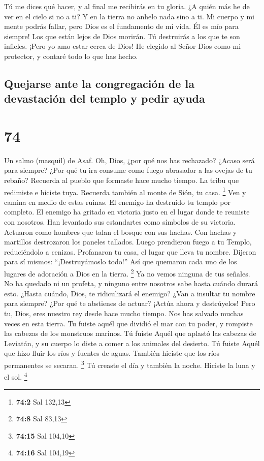  Tú me dices qué hacer, y al final me recibirás en tu
gloria.  ¿A quién más he de ver en el cielo si no a ti? Y
en la tierra no anhelo nada sino a ti.  Mi cuerpo y mi
mente podrás fallar, pero Dios es el fundamento de mi vida. Él es mío
para siempre!  Los que están lejos de Dios morirán. Tú
destruirás a los que te son infieles.  ¡Pero yo amo estar
cerca de Dios! He elegido al Señor Dios como mi protector, y contaré
todo lo que has hecho.

\hypertarget{quejarse-ante-la-congregaciuxf3n-de-la-devastaciuxf3n-del-templo-y-pedir-ayuda}{%
\subsection{Quejarse ante la congregación de la devastación del templo y
pedir
ayuda}\label{quejarse-ante-la-congregaciuxf3n-de-la-devastaciuxf3n-del-templo-y-pedir-ayuda}}

\hypertarget{section-73}{%
\section{74}\label{section-73}}

Un salmo (masquil) de Asaf.  Oh, Dios, ¿por qué nos has
rechazado? ¿Acaso será para siempre? ¿Por qué tu ira consume como fuego
abrasador a las ovejas de tu rebaño?  Recuerda al pueblo que
formaste hace mucho tiempo. La tribu que redimiste e hiciste tuya.
Recuerda también al monte de Sión, tu casa. \footnote{\textbf{74:2} Sal
  132,13}  Ven y camina en medio de estas ruinas. El enemigo
ha destruido tu templo por completo.  El enemigo ha gritado
en victoria justo en el lugar donde te reuniste con nosotros. Han
levantado sus estandartes como símbolos de su victoria. 
Actuaron como hombres que talan el bosque con sus hachas. 
Con hachas y martillos destrozaron los paneles tallados. 
Luego prendieron fuego a tu Templo, reduciéndolo a cenizas. Profanaron
tu casa, el lugar que lleva tu nombre.  Dijeron para sí
mismos: ``¡Destruyámoslo todo!'' Así que quemaron cada uno de los
lugares de adoración a Dios en la tierra. \footnote{\textbf{74:8} Sal
  83,13}  Ya no vemos ninguna de tus señales. No ha quedado
ni un profeta, y ninguno entre nosotros sabe hasta cuándo durará esto.
 ¿Hasta cuándo, Dios, te ridiculizará el enemigo? ¿Van a
insultar tu nombre para siempre?  ¿Por qué te abstienes de
actuar? ¡Actúa ahora y destrúyelos!  Pero tu, Dios, eres
nuestro rey desde hace mucho tiempo. Nos has salvado muchas veces en
esta tierra.  Tu fuiste aquél que dividió el mar con tu
poder, y rompiste las cabezas de los monstruos marinos.  Tú
fuiste Aquél que aplastó las cabezas de Leviatán, y su cuerpo lo diste a
comer a los animales del desierto.  Tú fuiste Aquél que
hizo fluir los ríos y fuentes de aguas. También hiciste que los ríos
permanentes se secaran. \footnote{\textbf{74:15} Sal 104,10}
 Tú creaste el día y también la noche. Hiciste la luna y el
sol. \footnote{\textbf{74:16} Sal 104,19}

